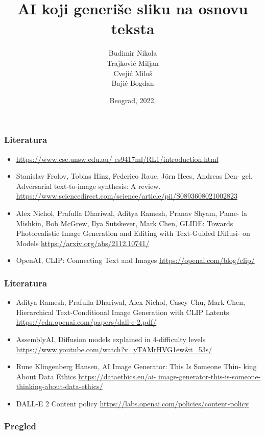 \documentclass{beamer}
\title{AI koji generiše sliku na osnovu teksta}
\author{Budimir Nikola\\ Trajković Miljan\\ Cvejić Miloš\\ Bajić Bogdan}
\institute{Matematički fakultet\\Univerzitet u Beogradu}
\date{
	\footnotesize{Beograd, 2022.}	
}
\begin{document}
\begin{frame}
	\thispagestyle{empty}
	\titlepage
\end{frame}

\addtocounter{framenumber}{-1}

\begin{frame}[fragile]\frametitle{Literatura}
	\begin{itemize}
		\item \url{https://www.cse.unsw.edu.au/ cs9417ml/RL1/introduction.html}\\
		\item Stanislav Frolov, Tobias Hinz, Federico Raue, Jörn Hees, Andreas Den-
gel, Adversarial text-to-image synthesis: A review. \url{https://www.sciencedirect.com/science/article/pii/S0893608021002823}\\
		\item Alex Nichol, Prafulla Dhariwal, Aditya Ramesh, Pranav Shyam, Pame-
la Mishkin, Bob McGrew, Ilya Sutskever, Mark Chen, GLIDE: Towards
Photorealistic Image Generation and Editing with Text-Guided Diffusi-
on Models \url{https://arxiv.org/abs/2112.10741/}\\
		\item OpenAI, CLIP: Connecting Text and Images \url{https://openai.com/blog/clip/}
	\end{itemize}
\end{frame}

\begin{frame}[fragile]\frametitle{Literatura}
	\begin{itemize}
		\item Aditya Ramesh, Prafulla Dhariwal, Alex Nichol, Casey Chu, Mark Chen,
Hierarchical Text-Conditional Image Generation with CLIP Latents \url{https://cdn.openai.com/papers/dall-e-2.pdf/}\\
		\item AssemblyAI, Diffusion models explained in 4-difficulty levels \url{https://www.youtube.com/watch?v=yTAMrHVG1ew&t=53s/}\\
		\item Rune Klingenberg Hansen, AI Image Generator: This Is Someone Thin-
king About Data Ethics \url{https://dataethics.eu/ai-
image-generator-this-is-someone-thinking-about-data-ethics/}
		\item DALL-E 2 Content policy \url{https://labs.openai.com/policies/content-policy}
	\end{itemize}
\end{frame}

\begin{frame}
	\frametitle{Pregled}
	\tableofcontents[hidesubsections] 
\end{frame}
\end{document}
